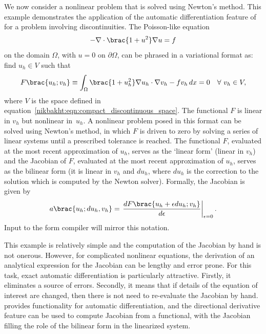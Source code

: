 We now consider a nonlinear problem that is solved using Newton's
method.  This example demonstrates the application of the automatic
differentiation feature of \ufl{} for a problem involving discontinuities.
The Poisson-like equation
%
\begin{equation}
  -\nabla \cdot \brac{1 + u^{2}} \nabla u = f
\end{equation}
%
on the domain $\Omega$, with $u = 0$ on $\partial \Omega$, can be phrased
in a variational format as: find $u_{h} \in V$ such that
%
\begin{equation}
  F\brac{u_{h}; v_{h}}
    \equiv \int_{\Omega} \brac{1 + u_{h}^{2}} \nabla u_{h} \cdot \nabla v_{h} - f v_{h}  \dif x
    = 0 \quad \forall \ v_{h} \in V,
\label{nikbakht:eqn:nonlinear_poisson}
\end{equation}
%
where $V$ is the space defined in
equation~\eqref{nikbakht:eqn:compact_discontinuous_space}. The functional $F$
is linear in $v_{h}$ but nonlinear in~$u_{h}$.  A nonlinear problem
posed in this format can be solved using Newton's method, in which
$F$ is driven to zero by solving a series of linear systems
until a prescribed tolerance is reached. The functional $F$, evaluated
at the most recent approximation of $u_{h}$, serves as the `linear form'
(linear in $v_{h}$) and the Jacobian of $F$, evaluated at the most recent
approximation of $u_{h}$, serves as the bilinear form (it is linear in
$v_{h}$ and $du_{h}$, where $du_{h}$ is the correction to the solution
which is computed by the Newton solver). Formally, the Jacobian is
given by
%
\begin{equation}
  a\brac{u_{h}; du_{h}, v_{h}} = \left. \frac{dF\brac{u_{h} + \epsilon du_{h}; v_{h}}}{d \epsilon} \right|_{\epsilon=0}.
\label{nikbakht:eqn:nonlinear_poisson_J}
\end{equation}
%
Input to the form compiler will mirror this notation.

This example is relatively simple and the computation of the Jacobian by
hand is not onerous. However, for complicated nonlinear equations, the
derivation of an analytical expression for the Jacobian can be lengthy
and error prone. For this task, exact automatic differentiation is
particularly attractive. Firstly, it eliminates a source of errors.
Secondly, it means that if details of the equation of interest are
changed, then there is not need to re-evaluate the Jacobian by hand. \ufl{}
provides functionality for automatic differentiation, and the directional derivative
feature can be used to compute Jacobian from a functional, with the
Jacobian filling the role of the bilinear form in the linearized system.

